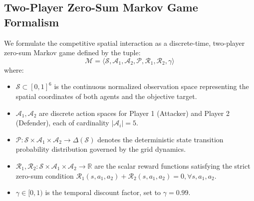 \documentclass[conference]{IEEEtran}
\begin{document}
\subsection{Two-Player Zero-Sum Markov Game Formalism}
We formulate the competitive spatial interaction as a discrete-time, two-player zero-sum Markov game defined by the tuple:
\begin{equation}
\mathcal{M} = \langle \mathcal{S}, \mathcal{A}_1, \mathcal{A}_2, \mathcal{P}, \mathcal{R}_1, \mathcal{R}_2, \gamma \rangle
\end{equation}
where:
\begin{itemize}
    \item $\mathcal{S} \subset [0, 1]^6$ is the continuous normalized observation space representing the spatial coordinates of both agents and the objective target.
    \item $\mathcal{A}_1, \mathcal{A}_2$ are discrete action spaces for Player 1 (Attacker) and Player 2 (Defender), each of cardinality $|\mathcal{A}_i| = 5$.
    \item $\mathcal{P}: \mathcal{S} \times \mathcal{A}_1 \times \mathcal{A}_2 \to \Delta(\mathcal{S})$ denotes the deterministic state transition probability distribution governed by the grid dynamics.
    \item $\mathcal{R}_1, \mathcal{R}_2: \mathcal{S} \times \mathcal{A}_1 \times \mathcal{A}_2 \to \mathbb{R}$ are the scalar reward functions satisfying the strict zero-sum condition $\mathcal{R}_1(s, a_1, a_2) + \mathcal{R}_2(s, a_1, a_2) = 0, \forall s, a_1, a_2$.
    \item $\gamma \in [0, 1)$ is the temporal discount factor, set to $\gamma = 0.99$.
\end{itemize}
\end{document}
